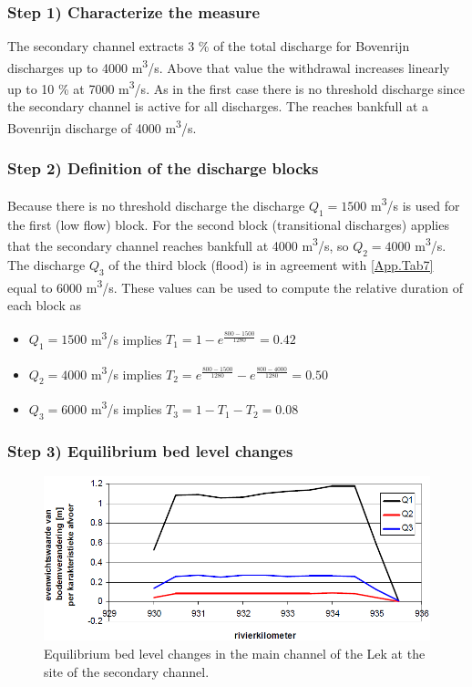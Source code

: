 \subsubsection*{Step 1) Characterize the measure}

The secondary channel extracts 3 \% of the total discharge for Bovenrijn discharges up to 4000 m\textsuperscript{3}/s.
Above that value the withdrawal increases linearly up to 10 \% at 7000 m\textsuperscript{3}/s.
As in the first case there is no threshold discharge since the secondary channel is active for all discharges.
The reaches bankfull at a Bovenrijn discharge of 4000 m\textsuperscript{3}/s.

\subsubsection*{Step 2) Definition of the discharge blocks}

Because there is no threshold discharge the discharge $Q_1 = 1500$ m\textsuperscript{3}/s is used for the first (low flow) block.
For the second block (transitional discharges) applies that the secondary channel reaches bankfull at 4000 m\textsuperscript{3}/s, so $Q_2 = 4000$ m\textsuperscript{3}/s.
The discharge $Q_3$ of the third block (flood) is in agreement with \autoref{App.Tab7} equal to 6000 m\textsuperscript{3}/s.
These values can be used to compute the relative duration of each block as

\begin{itemize}
\item $Q_1=1500$ m\textsuperscript{3}/s implies $T_1 = 1-e^{\frac{800-1500}{1280}} = 0.42$
\item $Q_2=4000$ m\textsuperscript{3}/s implies $T_2 = e^{\frac{800-1500}{1280}} - e^{\frac{800-4000}{1280}} = 0.50$
\item $Q_3=6000$ m\textsuperscript{3}/s implies $T_3 = 1-T_1-T_2 = 0.08$
\end{itemize}

\subsubsection*{Step 3) Equilibrium bed level changes}

\begin{figure}
\includegraphics[width=\columnwidth]{figures/Fig11.png}
\caption{Equilibrium bed level changes in the main channel of the Lek at the site of the secondary channel.}
\label{App.Fig11}
\end{figure}

